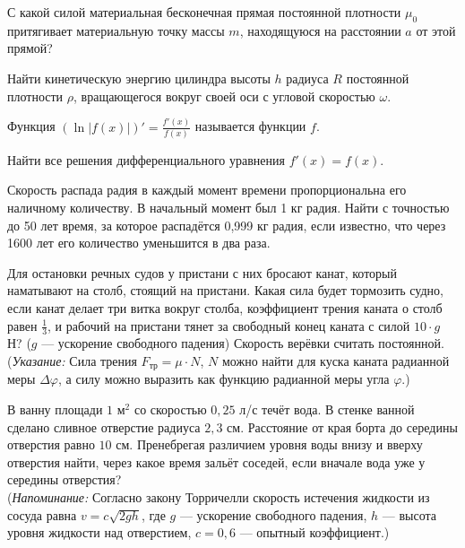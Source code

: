 \documentclass[12pt]{article}
\begin{document}
С какой силой материальная бесконечная прямая постоянной плотности $\mu_0$ притягивает материальную точку массы $m$, находящуюся на расстоянии  $a$ от
этой прямой?

Найти кинетическую энергию цилиндра высоты $h$ радиуса $R$ постоянной плотности $\rho$, вращающегося вокруг своей оси с угловой скоростью $\omega$.

 Функция $(\ln |f(x)|)' = \frac{f'(x)}{f(x)}$ называется  функции $f$.

Найти все решения дифференциального уравнения $f'(x) = f(x)$.

Скорость распада радия в каждый момент времени пропорциональна его наличному количеству. В начальный момент был 1 кг радия. Найти с точностью до 50 лет
время, за которое распадётся 0,999 кг радия, если известно, что через 1600 лет его количество уменьшится в два раза.

Для остановки речных судов у пристани с них бросают канат, который наматывают на столб,
стоящий на пристани. Какая сила будет тормозить судно, если канат делает три витка вокруг столба,
коэффициент трения каната о столб равен $\frac13$, и рабочий на пристани тянет за свободный конец
каната с силой $10\cdot g$ Н? ($g$ --- ускорение свободного падения) Скорость верёвки считать постоянной.\\
({\sl Указание:}
Сила трения $F_{тр} = \mu \cdot N$, $N$ можно найти для куска каната радианной меры
$\Delta \varphi$, а силу можно выразить как функцию радианной меры
угла $\varphi$.)





В ванну площади $1$ м$^2$ со скоростью $0,25$ л/с течёт вода. В стенке ванной сделано
сливное отверстие радиуса $2,3$ см. Расстояние от края борта до середины отверстия равно $10$ см.
Пренебрегая различием уровня воды внизу и вверху отверстия найти,
через какое время зальёт соседей, если вначале вода уже у середины отверстия?\\
({\sl Напоминание:}
Согласно закону Торричелли скорость истечения жидкости из сосуда равна $v = c\sqrt{2gh}$, где $g$ --- ускорение свободного падения, $h$ --- высота уровня
жидкости над отверстием,
$c=0,6$ --- опытный коэффициент.)


\end{document}
